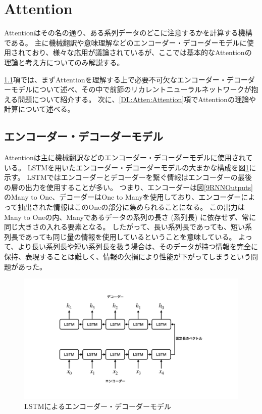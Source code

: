 \section{Attention} \label{DL:Attention}

Attention\cite{BahdanauAttention, LuongAttention}はその名の通り、ある系列データのどこに注意するかを計算する機構である。
主に機械翻訳や意味理解などのエンコーダー・デコーダーモデルに使用されており、様々な応用が議論されているが、ここでは基本的なAttentionの理論と考え方についてのみ解説する。

\ref{DL:Atten:EncoderDecoderModel}項では、まずAttentionを理解する上で必要不可欠なエンコーダー・デコーダーモデルについて述べ、その中で前節のリカレントニューラルネットワークが抱える問題について紹介する。
次に、\ref{DL:Atten:Attention}項でAttentionの理論や計算について述べる。


\subsection{エンコーダー・デコーダーモデル} \label{DL:Atten:EncoderDecoderModel}

Attentionは主に機械翻訳などのエンコーダー・デコーダーモデルに使用されている。
LSTMを用いたエンコーダー・デコーダーモデルの大まかな構成を図\ref{18EncoderDecoderLSTM}に示す。
LSTMではエンコーダーとデコーダーを繋ぐ情報はエンコーダーの最後の層の出力を使用することが多い。
つまり、エンコーダーは図\ref{9RNNOutputs}のMany to One、デコーダーはOne to Manyを使用しており、エンコーダーによって抽出された情報はこのOneの部分に集められることになる。
この出力はMany to Oneの内、Manyであるデータの系列の長さ (系列長) に依存せず、常に同じ大きさの入れる要素となる。
したがって、長い系列長であっても、短い系列長であっても同じ量の情報を使用しているということを意味している。
よって、より長い系列長や短い系列長を扱う場合は、そのデータが持つ情報を完全に保持、表現することは難しく、情報の欠損により性能が下がってしまうという問題があった。

\begin{figure}[htbp]
 \centering
 \includegraphics[trim = 100 100 100 100, width=1.0\textwidth, clip]{Figure/2DeepLearning/18EncoderDecoderLSTM.png}
 \caption{LSTMによるエンコーダー・デコーダーモデル}
 \label{18EncoderDecoderLSTM}
\end{figure}

